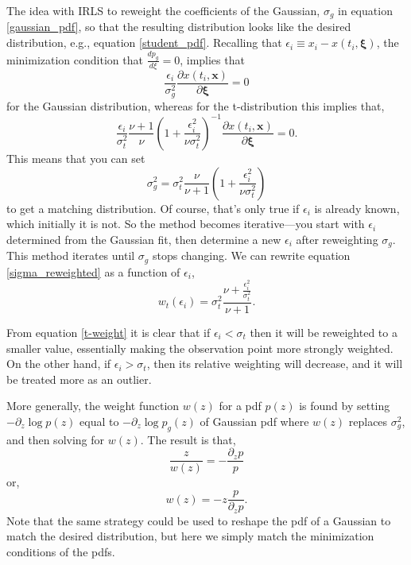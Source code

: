 \documentclass[10pt,journal]{IEEEtran}
\begin{document}
The idea with IRLS to reweight the coefficients of the Gaussian, $\sigma_g$ in equation \ref{gaussian_pdf}, so that the resulting distribution looks like the desired distribution, e.g., equation \ref{student_pdf}. Recalling that $\epsilon_i \equiv x_i - x(t_i,\mathbf{\xi})$, the minimization condition that $\frac{d p_g}{d\xi}=0$, implies that
\begin{equation}
\frac{\epsilon_i}{\sigma_g^2} \frac{\partial x(t_i,\mathbf{x})}{\partial \mathbf{\xi}} = 0
\end{equation}
for the Gaussian distribution, whereas for the t-distribution this implies that,
\begin{equation}
 \frac{\epsilon_i}{\sigma_t^2} \frac{\nu+1}{\nu} \left( 1 + \frac{\epsilon_i^2}{\nu \sigma_t^2} \right)^{-1}  \frac{\partial x(t_i,\mathbf{x})}{\partial \mathbf{\xi}}  = 0.
\end{equation}
This means that you can set
\begin{equation}
\sigma_g^2 =   \sigma_t^2 \frac{\nu}{\nu+1} \left( 1 + \frac{\epsilon_i^2}{\nu \sigma_t^2} \right)
\label{sigma_reweighted}
\end{equation}
to get a matching distribution. Of course, that's only true if $\epsilon_i$ is already known, which initially it is not. So the method becomes iterative---you start with $\epsilon_i$ determined from the Gaussian fit, then determine a new $\epsilon_i$ after reweighting $\sigma_g$. This method iterates until $\sigma_g$ stops changing. We can rewrite equation \ref{sigma_reweighted} as a function of $\epsilon_i$,
\begin{equation}
\label{t-weight}
w_t(\epsilon_i) = \sigma_t^2 \frac{\nu  + \frac{\epsilon_i^2}{\sigma_t^2}}{\nu+1}.
\end{equation}

From equation \ref{t-weight} it is clear that if $\epsilon_i < \sigma_t$ then it will be reweighted to a smaller value, essentially making the observation point more strongly weighted. On the other hand, if $\epsilon_i > \sigma_t$, then its relative weighting will decrease, and it will be treated more as an outlier.

More generally, the weight function $w(z)$ for a pdf $p(z)$ is found by setting $-\partial_z \log p(z)$ equal to $-\partial_z \log p_g(z)$ of Gaussian pdf where $w(z)$ replaces $\sigma_g^2$,
and then solving for $w(z)$. The result is that,
\begin{equation}
    \frac{z}{w(z)} = - \frac{\partial_z p}{p}
\end{equation}
or,
\begin{equation}
    w(z) = -z \frac{p}{\partial_z p}.
\end{equation}
Note that the same strategy could be used to reshape the pdf of a Gaussian to match the desired distribution, but here we simply match the minimization conditions of the pdfs.
\end{document}
